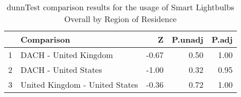 \begin{table}[ht]
\centering
\begin{tabular}{rlrrr}
  \hline
 & Comparison & Z & P.unadj & P.adj \\ 
  \hline
1 & DACH - United Kingdom & -0.67 & 0.50 & 1.00 \\ 
  2 & DACH - United States & -1.00 & 0.32 & 0.95 \\ 
  3 & United Kingdom - United States & -0.36 & 0.72 & 1.00 \\ 
   \hline
\end{tabular}
\caption{dunnTest comparison results for the usage of Smart Lightbulbs Overall by Region of Residence} 
\end{table}
